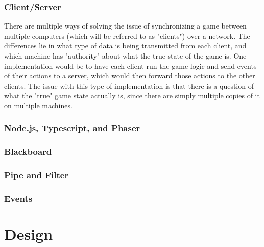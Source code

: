 \documentclass[12pt]{report}
\begin{document}
\subsection{Client/Server}
There are multiple ways of solving the issue of synchronizing a game between
multiple computers (which will be referred to as "clients") over a network.  The
differences lie in what type of data is being transmitted from each client, and
which machine has "authority" about what the true state of the game is.  One
implementation would be to have each client run the game logic and send
events of their actions to a server, which would then forward those actions to
the other clients.  The issue with this type of implementation is that there is
a question of what the "true" game state actually is, since there are simply
multiple copies of it on multiple machines.  

\subsection{Node.js, Typescript, and Phaser}
\subsection{Blackboard}
\subsection{Pipe and Filter}
\subsection{Events}

\chapter{Design}
\end{document}
